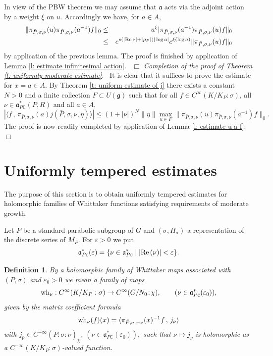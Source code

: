 \documentclass[12pt,a4paper]{article}
\newtheorem{Defi}[Thm]{Definition}
\newenvironment{defi}[0]{\begin{Defi}\noindent\rm}%
{\end{Defi}}
\def\proof{\par\noindent{\it Proof.}{\ }{\ }}
\def\qed{~\hfill\hbox{$\Box$}\medbreak}
\def\medno{\medbreak\noindent}
\def\qquad{\quad\quad}
\def\msy#1{{\mathbb #1}}
\def\C{{\msy C}}
\def\ge{\varepsilon}
\def\gs{\sigma}
\def\got#1{\mathfrak #1}
\def\fa{{\got a}}
\def\fg{{\got g}}
\def\to{\rightarrow}
\def\Re{{\rm Re}\,}
\def\inp#1#2{\langle#1\,,\,#2\rangle}
\def\iC{{\scriptscriptstyle \C}}
\numberwithin{Thm}{section}
\numberwithin{equation}{section}
\def\faPdc{{\fa_{P\iC}^*}}
\numberwithin{equation}{section}
\def\faPdc{\fa_{P\iC}^*}
\def\wh{{\rm wh}}
\def\col{\!:\!}
\def\cchi{\chi}
\def\gsP{\gs}%
\begin{document}
\proof 
In view of the PBW theorem we may assume that $\fa$ acts via the adjoint action by a weight $\xi$ on $u.$ 
Accordingly we have, for $a \in A,$ 
\begin{eqnarray*}
\|\pi_{\bar P, \gs, \nu}(u)\pi_{\bar P, \gs, \nu}(a^{-1}) f\|_0 
& \leq & a^{\xi} |\pi_{\bar P, \gs, \nu}(a^{-1}) \pi_{\bar P, \gs, \nu}(u) f\|_0\\
& \leq & e^{s(|\Re \nu| + |\rho_P|)|\log a|} e^{\xi(\log a)} \|\pi_{\bar P, \gs, \nu}(u) f\|_0
\end{eqnarray*}
by application of the previous lemma. The proof is finished by application of Lemma
\ref{l: estimate infinitesimal action}.
\qed
\medno
{\em Completion of the proof of Theorem \ref{t: uniformly moderate estimate}.\ }
It is clear that it suffices to prove the estimate  for $x =a \in A.$
By Theorem \ref{t: uniform estimate of j} there exists a constant $N > 0$ and a finite collection
$F \subset U(\fg)$ such that for all $f \in C^\infty(K/K_P:\gsP)$, all $\nu \in \faPdc(P,R)$ 
and all $a \in A,$ 
$$ 
|\inp{f}{\pi_{\bar P, \gs, \nu}(a) j(\bar P, \gs, \nu,\eta)}| \leq  
(1 + |\nu|)^N \|\eta\| \max_{u \in F} \| \pi_{\bar P, \gs, \nu}(u) \pi_{\bar P, \gs, \nu}(a^{-1})f \|_0.
$$ 
The proof is now readily completed by application of Lemma \ref{l: estimate u a f}.
\qed

\section{Uniformly tempered estimates}
\label{s: uni temp estimates}
The purpose of this section is to obtain uniformly tempered estimates for holomorphic families 
of Whittaker functions satisfying requirements of moderate growth.
 
Let $P$ be a standard parabolic subgroup of $G$ and  $(\gs, H_\gs)$ a representation
of the discrete series of $M_P.$ For $\ge > 0$ we put 
$$
\faPdc(\ge) = \{\nu \in \faPdc\mid |\Re (\nu)| < \ge\}.
$$
\begin{defi}
\label{d: whittaker family}
By a holomorphic family of Whittaker maps associated
with $(P,\gs)$ and $\ge_0 > 0$ we mean a family of maps
\begin{equation}
\label{e: intro w nu}
\wh_\nu: C^\infty(K/K_P:\gs) \to C^\infty(G/N_0\col \cchi) , \qquad (\nu \in \faPdc(\ge_0)),
\end{equation}
given by the matrix coefficient formula
\begin{equation}
\label{e: w nu as matrix coeff}
\wh_\nu(f)(x) = \inp{\pi_{\bar P,\gs, -\nu}(x)^{-1} f}{j_{\bar \nu}}
\end{equation}  
with $ j_{\bar \nu} \in C^{-\infty}(\bar P: \gs: \bar \nu)_\cchi$, $(\nu \in \faPdc(\ge_0)),$ 
such that $\nu \mapsto j_{\nu}$ is holomorphic as a $C^{-\infty}(K/K_P:\gs)$-valued 
function.
\end{defi}
\end{document}
